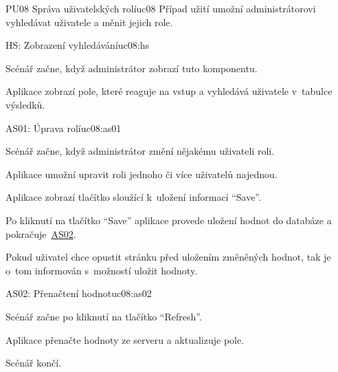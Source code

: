 \begin{usecase}{PU08 Správa uživatelských rolí}{uc08}
    Případ užití umožní administrátorovi vyhledávat uživatele a měnit jejich role.

    \begin{scenario}{HS: Zobrazení vyhledávání}{uc08:hs}
        \item Scénář začne, když administrátor zobrazí tuto komponentu.
        \item Aplikace zobrazí pole, které reaguje na vstup a vyhledává uživatele v~tabulce výsledků.
    \end{scenario}

    \begin{scenario}{AS01: Úprava rolí}{uc08:as01}
        \item Scénář začne, když administrátor změní nějakému uživateli roli.
        \item Aplikace umožní upravit roli jednoho či více uživatelů najednou.
        \item Aplikace zobrazí tlačítko sloužící k~uložení informací \enquote{Save}.
        \item Po kliknutí na tlačítko \enquote{Save} aplikace provede uložení hodnot do databáze a pokračuje~\hyperref[uc02:as02]{AS02}.
        \item Pokud uživatel chce opustit stránku před uložením změněných hodnot, tak je o~tom informován s~možností uložit hodnoty.
    \end{scenario}

    \begin{scenario}{AS02: Přenačtení hodnot}{uc08:as02}
        \item Scénář začne po kliknutí na tlačítko \enquote{Refresh}.
        \item Aplikace přenačte hodnoty ze serveru a aktualizuje pole.
        \item Scénář končí.
    \end{scenario}
\end{usecase}